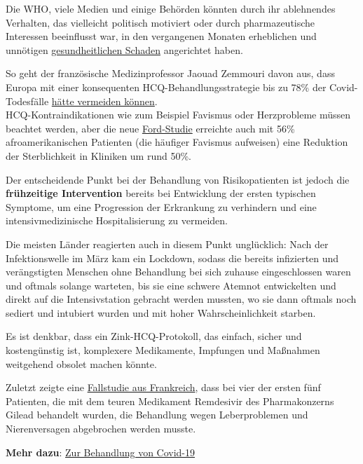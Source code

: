 Die WHO, viele Medien und einige Behörden könnten durch ihr ablehnendes
Verhalten, das vielleicht politisch motiviert oder durch pharmazeutische
Interessen beeinflusst war, in den vergangenen Monaten erheblichen und
unnötigen
\href{https://www.youtube.com/watch?v=UIDsKdeFOmQ}{gesundheitlichen
Schaden} angerichtet haben.

So geht der französische Medizinprofessor Jaouad Zemmouri davon aus,
dass Europa mit einer konsequenten HCQ-Behandlungsstrategie bis zu 78\%
der Covid-Todesfälle
\href{https://www.moroccoworldnews.com/2020/06/306587/moroccan-scientist-moroccos-chloroquine-success-reveals-european-failures/}{hätte
vermeiden können}.\\

HCQ-Kontraindikationen wie zum Beispiel Favismus oder Herzprobleme
müssen beachtet werden, aber die neue
\href{https://www.henryford.com/news/2020/07/hydro-treatment-study}{Ford-Studie}
erreichte auch mit 56\% afroamerikanischen Patienten (die häufiger
Favismus aufweisen) eine Reduktion der Sterblichkeit in Kliniken um rund
50\%.

Der entscheidende Punkt bei der Behandlung von Risikopatienten ist
jedoch die \textbf{frühzeitige Intervention} bereits bei Entwicklung der
ersten typischen Symptome, um eine Progression der Erkrankung zu
verhindern und eine intensivmedizinische Hospitalisierung zu vermeiden.

Die meisten Länder reagierten auch in diesem Punkt unglücklich: Nach der
Infektionswelle im März kam ein Lockdown, sodass die bereits infizierten
und verängstigten Menschen ohne Behandlung bei sich zuhause
eingeschlossen waren und oftmals solange warteten, bis sie eine schwere
Atemnot entwickelten und direkt auf die Intensivstation gebracht werden
mussten, wo sie dann oftmals noch sediert und intubiert wurden und mit
hoher Wahrscheinlichkeit starben.

Es ist denkbar, dass ein Zink-HCQ-Protokoll, das einfach, sicher und
kostengünstig ist, komplexere Medikamente, Impfungen und Maßnahmen
weitgehend obsolet machen könnte.

Zuletzt zeigte eine
\href{https://www.sciencedirect.com/science/article/pii/S1201971220305282}{Fallstudie
aus Frankreich}, dass bei vier der ersten fünf Patienten, die mit dem
teuren Medikament Remdesivir des Pharmakonzerns Gilead behandelt wurden,
die Behandlung wegen Leberproblemen und Nierenversagen abgebrochen
werden musste.

\textbf{Mehr dazu}:
\href{https://swprs.org/zur-behandlung-von-covid-19/}{Zur Behandlung von
Covid-19}

